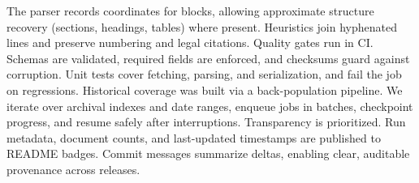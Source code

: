 \documentclass[10pt,a4paper,twocolumn]{article}%
\begin{document}
The parser records coordinates for blocks, allowing approximate structure recovery (sections, headings, tables) where present. Heuristics join hyphenated lines and preserve numbering and legal citations.%
\cite{DocumentLayoutAnalysis2021}%
\newline%
\newline%
Quality gates run in CI. Schemas are validated, required fields are enforced, and checksums guard against corruption. Unit tests cover fetching, parsing, and serialization, and fail the job on regressions.%
\cite{DataQuality2022}%
\newline%
\newline%
Historical coverage was built via a back{-}population pipeline. We iterate over archival indexes and date ranges, enqueue jobs in batches, checkpoint progress, and resume safely after interruptions.%
\cite{HistoricalWebData2019}%
\newline%
\newline%
Transparency is prioritized. Run metadata, document counts, and last{-}updated timestamps are published to README badges. Commit messages summarize deltas, enabling clear, auditable provenance across releases.%
\cite{OpenDataPractices2020}%
\newline%
\newline

%
\end{document}

